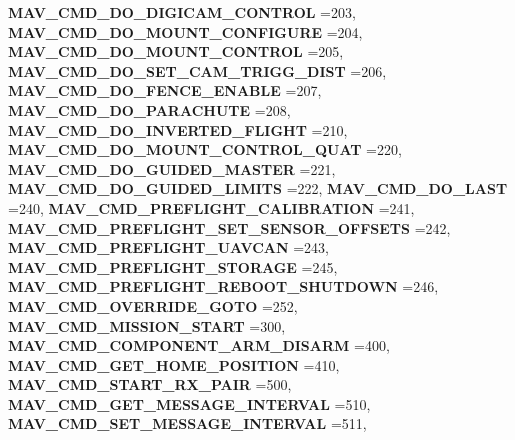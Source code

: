 \begin{DoxyCompactItemize}
\textbf{ M\+A\+V\+\_\+\+C\+M\+D\+\_\+\+D\+O\+\_\+\+D\+I\+G\+I\+C\+A\+M\+\_\+\+C\+O\+N\+T\+R\+OL} =203, 
\newline
\textbf{ M\+A\+V\+\_\+\+C\+M\+D\+\_\+\+D\+O\+\_\+\+M\+O\+U\+N\+T\+\_\+\+C\+O\+N\+F\+I\+G\+U\+RE} =204, 
\textbf{ M\+A\+V\+\_\+\+C\+M\+D\+\_\+\+D\+O\+\_\+\+M\+O\+U\+N\+T\+\_\+\+C\+O\+N\+T\+R\+OL} =205, 
\textbf{ M\+A\+V\+\_\+\+C\+M\+D\+\_\+\+D\+O\+\_\+\+S\+E\+T\+\_\+\+C\+A\+M\+\_\+\+T\+R\+I\+G\+G\+\_\+\+D\+I\+ST} =206, 
\textbf{ M\+A\+V\+\_\+\+C\+M\+D\+\_\+\+D\+O\+\_\+\+F\+E\+N\+C\+E\+\_\+\+E\+N\+A\+B\+LE} =207, 
\newline
\textbf{ M\+A\+V\+\_\+\+C\+M\+D\+\_\+\+D\+O\+\_\+\+P\+A\+R\+A\+C\+H\+U\+TE} =208, 
\textbf{ M\+A\+V\+\_\+\+C\+M\+D\+\_\+\+D\+O\+\_\+\+I\+N\+V\+E\+R\+T\+E\+D\+\_\+\+F\+L\+I\+G\+HT} =210, 
\textbf{ M\+A\+V\+\_\+\+C\+M\+D\+\_\+\+D\+O\+\_\+\+M\+O\+U\+N\+T\+\_\+\+C\+O\+N\+T\+R\+O\+L\+\_\+\+Q\+U\+AT} =220, 
\textbf{ M\+A\+V\+\_\+\+C\+M\+D\+\_\+\+D\+O\+\_\+\+G\+U\+I\+D\+E\+D\+\_\+\+M\+A\+S\+T\+ER} =221, 
\newline
\textbf{ M\+A\+V\+\_\+\+C\+M\+D\+\_\+\+D\+O\+\_\+\+G\+U\+I\+D\+E\+D\+\_\+\+L\+I\+M\+I\+TS} =222, 
\textbf{ M\+A\+V\+\_\+\+C\+M\+D\+\_\+\+D\+O\+\_\+\+L\+A\+ST} =240, 
\textbf{ M\+A\+V\+\_\+\+C\+M\+D\+\_\+\+P\+R\+E\+F\+L\+I\+G\+H\+T\+\_\+\+C\+A\+L\+I\+B\+R\+A\+T\+I\+ON} =241, 
\textbf{ M\+A\+V\+\_\+\+C\+M\+D\+\_\+\+P\+R\+E\+F\+L\+I\+G\+H\+T\+\_\+\+S\+E\+T\+\_\+\+S\+E\+N\+S\+O\+R\+\_\+\+O\+F\+F\+S\+E\+TS} =242, 
\newline
\textbf{ M\+A\+V\+\_\+\+C\+M\+D\+\_\+\+P\+R\+E\+F\+L\+I\+G\+H\+T\+\_\+\+U\+A\+V\+C\+AN} =243, 
\textbf{ M\+A\+V\+\_\+\+C\+M\+D\+\_\+\+P\+R\+E\+F\+L\+I\+G\+H\+T\+\_\+\+S\+T\+O\+R\+A\+GE} =245, 
\textbf{ M\+A\+V\+\_\+\+C\+M\+D\+\_\+\+P\+R\+E\+F\+L\+I\+G\+H\+T\+\_\+\+R\+E\+B\+O\+O\+T\+\_\+\+S\+H\+U\+T\+D\+O\+WN} =246, 
\textbf{ M\+A\+V\+\_\+\+C\+M\+D\+\_\+\+O\+V\+E\+R\+R\+I\+D\+E\+\_\+\+G\+O\+TO} =252, 
\newline
\textbf{ M\+A\+V\+\_\+\+C\+M\+D\+\_\+\+M\+I\+S\+S\+I\+O\+N\+\_\+\+S\+T\+A\+RT} =300, 
\textbf{ M\+A\+V\+\_\+\+C\+M\+D\+\_\+\+C\+O\+M\+P\+O\+N\+E\+N\+T\+\_\+\+A\+R\+M\+\_\+\+D\+I\+S\+A\+RM} =400, 
\textbf{ M\+A\+V\+\_\+\+C\+M\+D\+\_\+\+G\+E\+T\+\_\+\+H\+O\+M\+E\+\_\+\+P\+O\+S\+I\+T\+I\+ON} =410, 
\textbf{ M\+A\+V\+\_\+\+C\+M\+D\+\_\+\+S\+T\+A\+R\+T\+\_\+\+R\+X\+\_\+\+P\+A\+IR} =500, 
\newline
\textbf{ M\+A\+V\+\_\+\+C\+M\+D\+\_\+\+G\+E\+T\+\_\+\+M\+E\+S\+S\+A\+G\+E\+\_\+\+I\+N\+T\+E\+R\+V\+AL} =510, 
\textbf{ M\+A\+V\+\_\+\+C\+M\+D\+\_\+\+S\+E\+T\+\_\+\+M\+E\+S\+S\+A\+G\+E\+\_\+\+I\+N\+T\+E\+R\+V\+AL} =511, 

\end{DoxyCompactItemize}

